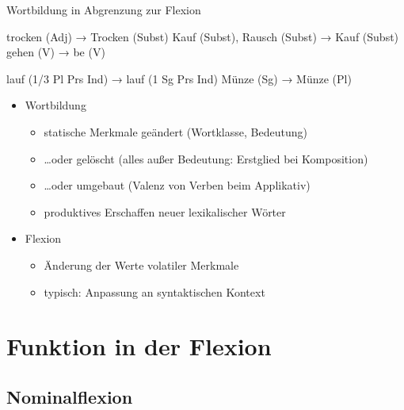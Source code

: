 \begin{frame}
  {Wortbildung in Abgrenzung zur Flexion}
  \pause
  \begin{exe}
    \ex
    \begin{xlist}
      \ex trocken (Adj) → \alert{Trocken} (Subst)
      \ex Kauf (Subst), Rausch (Subst) → \alert{Kauf} (Subst)
      \ex gehen (V) → \alert{be} (V)
    \end{xlist}
    \pause
    \ex
    \begin{xlist}
      \ex \alert{lauf} (1\slash 3 Pl Prs Ind) → \alert{lauf} (1 Sg Prs Ind)
      \ex \alert{Münze} (Sg) → \alert{Münze} (Pl)
    \end{xlist}
  \end{exe}
  \pause
  \Halbzeile
  \begin{itemize}[<+->]
    \item Wortbildung
      \begin{itemize}[<+->]
        \item statische Merkmale geändert (Wortklasse, Bedeutung)
        \item \ldots oder gelöscht (alles außer Bedeutung: Erstglied bei Komposition)
        \item \ldots oder umgebaut (Valenz von Verben beim Applikativ)
        \item \alert{produktives Erschaffen neuer lexikalischer Wörter}
      \end{itemize}
  \Halbzeile
    \item Flexion
      \begin{itemize}
        \item Änderung der Werte volatiler Merkmale
        \item typisch: Anpassung an syntaktischen Kontext
      \end{itemize}
  \end{itemize}
\end{frame}

\section{Funktion in der Flexion}

\subsection{Nominalflexion}

